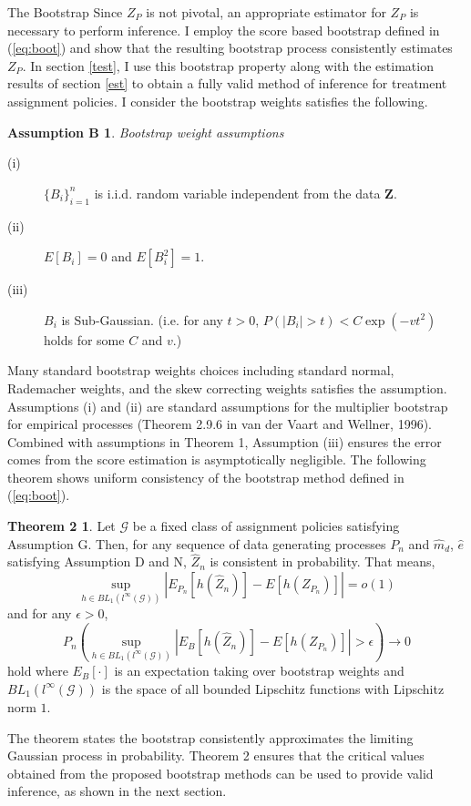 \documentclass[12pt,oneside,reqno,english]{amsart}
\makeatletter
\renewcommand\subsection{\@startsection{subsection}{2}%
  \z@{-.5\linespacing\@plus-.7\linespacing}{.5\linespacing}%
  {\normalfont\scshape}}
\theoremstyle{definition}
\newtheorem*{thm2}{Theorem 2}
\newtheorem*{asmB}{Assumption B}
\makeatother
\begin{document}
\subsection{The Bootstrap}\label{boot}
Since $Z_{P}$ is not pivotal, an appropriate estimator for $Z_{P}$ is necessary to perform inference. 
I employ the score based bootstrap defined in (\ref{eq:boot}) and show that the resulting bootstrap process consistently estimates $Z_{P}$. 
In section \ref{test}, I use this bootstrap property along with the estimation results of section \ref{est} to obtain a fully valid method of inference for treatment assignment policies.  I consider the bootstrap weights satisfies the following.
\begin{asmB} \textit{Bootstrap weight assumptions}
\begin{description}
    \item[{(i)}] $\{B_{i}\}_{i=1}^{n}$ is i.i.d. random variable independent from the data $\mathbf{Z}$. 
    \item[{(ii)}] $E[B_{i}]=0$ and $E[B_{i}^{2}]=1$.
    \item[{(iii)}] $B_{i}$ is Sub-Gaussian. (i.e. for any $t>0$, $P(|B_{i}|>t)<C\exp(-vt^{2})$ holds for some $C$ and $v$.)  
\end{description}
\end{asmB}
Many standard bootstrap weights choices including standard normal, Rademacher weights, and the skew correcting weights \citep{Mammen:93} satisfies the assumption. 
Assumptions (i) and (ii) are standard assumptions for the multiplier bootstrap for empirical processes (Theorem 2.9.6 in van der Vaart and Wellner, 1996). 
Combined with assumptions in Theorem 1, Assumption (iii) ensures the error comes from the score estimation is asymptotically negligible. 
The following theorem shows uniform consistency of the bootstrap method defined in (\ref{eq:boot}). 
\begin{thm2}
Let $\mathcal{G}$ be a fixed class of assignment policies satisfying Assumption G.  
Then, for any sequence of data generating processes $P_{n}$ and $\hat{m}_{d}$, $\hat{e}$ satisfying Assumption D and N, $\hat{Z}_{n}$ is consistent in probability. That 
means, 
\[\sup_{h\in BL_{1}(l^{\infty}(\mathcal{G}))}|E_{P_{n}}[h(\hat{Z}_{n})]-E[h(Z_{P_{n}})]|=o(1)\]
and for any $\epsilon>0$,
\[P_{n}(\sup_{h\in BL_{1}(l^{\infty}(\mathcal{G}))}|E_{B}[h(\hat{Z}_{n})]-E[h(Z_{P_{n}})]|>\epsilon)\rightarrow 0\]
hold where $E_{B}[\cdot]$ is an expectation taking over bootstrap weights
and $BL_{1}(l^{\infty}(\mathcal{G}))$ is the space of all bounded Lipschitz functions with Lipschitz norm $1$. 
\end{thm2}
The theorem states the bootstrap consistently approximates the limiting Gaussian process in probability. Theorem 2 ensures that the critical values obtained from the 
proposed bootstrap methods can be used to provide valid inference, as shown in the next section. 
\end{document}
